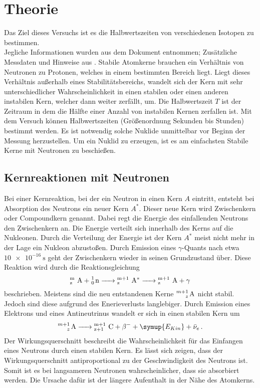\section{Theorie}
\label{sec:Theorie}
Das Ziel dieses Versuchs ist es die Halbwertszeiten von verschiedenen Isotopen zu bestimmen.
\\
Jegliche Informationen wurden aus dem Dokument \cite{v703} entnommen; Zusätzliche Messdaten und Hinweise aus \cite{hinweise}.
Stabile Atomkerne brauchen ein Verhältnis von Neutronen zu Protonen, welches in einem bestimmten Bereich liegt. Liegt dieses Verhältnis außerhalb eines Stabilitätsbereichs,
wandelt sich der Kern mit sehr unterschiedlicher Wahrscheinlichkeit in einen stabilen oder einen anderen instabilen Kern, welcher dann weiter zerfällt, um.
Die Halbwertszeit $T$ ist der Zeitraum in dem die Hälfte einer Anzahl von instabilen Kernen zerfallen ist. Mit dem Versuch können Halbwertszeiten (Größenordnung
Sekunden bis Stunden) bestimmt werden. Es ist notwendig solche Nuklide unmittelbar vor Beginn der Messung herzustellen. Um ein Nuklid zu erzeugen,
ist es am einfachsten Stabile Kerne mit Neutronen zu beschießen.
\subsection{Kernreaktionen mit Neutronen}
Bei einer Kernreaktion, bei der ein Neutron in einen Kern $A$ eintritt, entsteht bei Absorption des Neutrons ein neuer Kern $A^*$.
Dieser neue Kern wird Zwischenkern oder Compoundkern genannt. Dabei regt die Energie des einfallenden Neutrons den Zwischenkern an. Die Energie verteilt sich innerhalb des Kerns auf die Nukleonen.
Durch die Verteilung der Energie ist der Kern $A^*$ meist nicht mehr in der Lage ein Nukleon abzustoßen. Durch Emission eines $\gamma$-Quants nach etwa $\SI{10e-16}{\second}$
geht der Zwischenkern wieder in seinen Grundzustand über. 
Diese Reaktion wird durch die Reaktionsgleichung
\begin{equation*}
    \ce{{^m_z A} + \ce{^1_0 n} -> {^{m+1}_z A^*} -> {^{m+1}_z A} } + \gamma 
\end{equation*}
beschrieben.
Meistens sind die neu entstandenen Kerne $\ce{^{m+1}_z A}$ nicht stabil. Jedoch sind diese aufgrund des Enerieverlusts langlebiger.
Durch Emission eines Elektrons und eines Antineutrinus wandelt er sich in einen stabilen Kern um
\begin{equation*}
    \ce{^{m+1}_z A -> {^{m+1}_{z+1} C} + $\beta$- }+\symup{E_{Kin}} + \bar{\nu}_e \, .
\end{equation*}
Der Wirkungsquerschnitt beschreibt die Wahrscheinlichkeit für das Einfangen eines Neutrons durch einen stabilen Kern. 
Es lässt sich zeigen, dass der Wirkungsquerschnitt antiproportional zu der Geschwindigkeit des Neutrons ist. Somit ist es bei langsameren Neutronen wahrscheinlicher, dass sie absorbiert werden.
Die Ursache dafür ist der längere Aufenthalt in der Nähe des Atomkerns.
